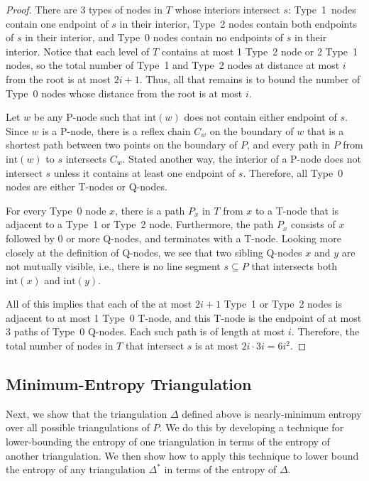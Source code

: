 \documentclass[lotsofwhite]{patmorin}
\newcommand{\interior}{\mathrm{int}}
\begin{document}
\begin{proof}
There are 3 types of nodes in $T$ whose interiors intersect $s$:
Type~1~nodes contain one endpoint of $s$ in their interior, Type~2
nodes contain both endpoints of $s$ in their interior, and Type~0
nodes contain no endpoints of $s$ in their interior.  Notice that each
level of $T$ contains at most 1 Type~2 node or 2 Type~1 nodes, so the
total number of Type~1 and Type~2 nodes at distance at most $i$ from
the root is at most $2i+1$.  Thus, all
that remains is to bound the number of Type~0 nodes whose distance
from the root is at most $i$.

Let $w$ be any P-node such that $\interior(w)$ does not contain either
endpoint of $s$.  Since $w$ is a P-node, there is a reflex chain $C_w$
on the boundary of $w$ that is a shortest path between two points on
the boundary of $P$, and every path in $P$ from $\interior(w)$ to $s$
intersects $C_w$. Stated another way, the interior of a P-node does
not intersect $s$ unless it contains at least one endpoint of $s$.
Therefore, all Type~0 nodes are either T-nodes or Q-nodes.

For every Type~0 node $x$, there is a path $P_x$ in $T$ from $x$ to a
T-node that is adjacent to a Type~1 or Type~2 node.  Furthermore, the
path $P_x$ consists of $x$ followed by 0 or more Q-nodes, and
terminates with a T-node.  Looking more closely at the definition of
Q-nodes, we see that two sibling Q-nodes $x$ and $y$ are not mutually
visible, i.e., there is no line segment $s\subseteq P$ that intersects
both $\interior(x)$ and $\interior(y)$.

All of this implies that each of the at most $2i+1$ Type~1 or Type~2 
nodes is adjacent to at most 1 Type~0 T-node, and this T-node is the
endpoint of at most 3 paths of Type~0 Q-nodes. Each such path is of
length at most $i$.  Therefore, the total number of nodes in $T$ that
intersect $s$ is at most  $2i\cdot 3i=6i^2$.
\end{proof}

\subsection{Minimum-Entropy Triangulation}

Next, we show that the triangulation $\Delta$ defined above is
nearly-minimum entropy over all possible triangulations of $P$.  We do
this by developing a technique for lower-bounding the entropy of one
triangulation in terms of the entropy of another triangulation.  We
then show how to apply this technique to lower bound the entropy of
any triangulation $\Delta^*$ in terms of the entropy of $\Delta$.
  
\end{document}
